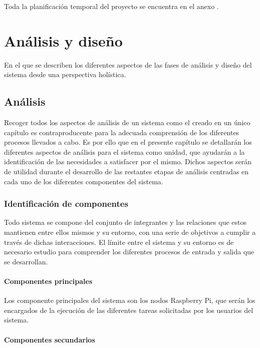 Toda la planificación temporal del proyecto se encuentra en el anexo \citationneeded[TODO].

\chapter{Análisis y diseño}
\label{chapter:analisis}

\begin{cabstract}
En el que se describen los diferentes aspectos de las fases de análisis y diseño del sistema desde una perspectiva holística.
\end{cabstract}

\section{Análisis}

Recoger todos los aspectos de análisis de un sistema como el creado en un único capítulo es contraproducente para la adecuada comprensión de los diferentes procesos llevados a cabo. Es por ello que en el presente capítulo se detallarán los diferentes aspectos de análisis para el sistema como unidad, que ayudarán a la identificación de las necesidades a satisfacer por el mismo. Dichos aspectos serán de utilidad durante el desarrollo de las restantes etapas de análisis centradas en cada uno de los diferentes componentes del sistema.

\subsection{Identificación de componentes}

Todo sistema se compone del conjunto de integrantes y las relaciones que estos mantienen entre ellos mismos y su entorno, con una serie de objetivos a cumplir a través de dichas interacciones. El límite entre el sistema y su entorno es de necesario estudio para comprender los diferentes procesos de  entrada y salida que se desarrollan.

\subsubsection{Componentes principales} 

Los componente principales del sistema son los nodos Raspberry Pi, que serán los encargados de la ejecución de las diferentes tareas solicitadas por los usuarios del sistema.

\subsubsection{Componentes secundarios}

